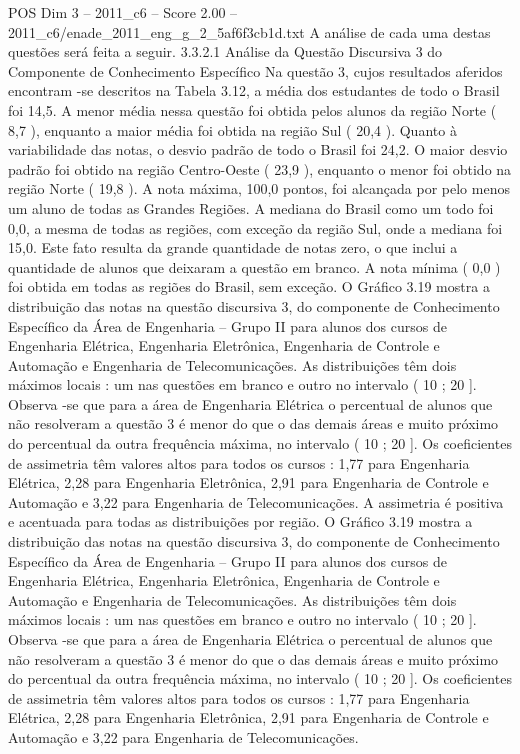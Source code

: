 \begin{textsample}{POS Dim 3 – 2011\_c6 – Score 2.00 – 2011\_c6/enade\_2011\_eng\_g\_2\_5af6f3cb1d.txt}
A análise de cada uma destas questões será feita a seguir. 3.3.2.1 Análise da Questão Discursiva 3 do Componente de Conhecimento Específico Na questão 3, cujos resultados aferidos encontram -se descritos na Tabela 3.12, a média dos estudantes de todo o Brasil foi 14,5.
A menor média nessa questão foi obtida pelos alunos da região Norte ( 8,7 ), enquanto a maior média foi obtida na região Sul ( 20,4 ).
Quanto à variabilidade das notas, o desvio padrão de todo o Brasil foi 24,2.
O maior desvio padrão foi obtido na região Centro-Oeste ( 23,9 ), enquanto o menor foi obtido na região Norte ( 19,8 ).
A nota máxima, 100,0 pontos, foi alcançada por pelo menos um aluno de todas as Grandes Regiões.
A mediana do Brasil como um todo foi 0,0, a mesma de todas as regiões, com exceção da região Sul, onde a mediana foi 15,0.
Este fato resulta da grande quantidade de notas zero, o que inclui a quantidade de alunos que deixaram a questão em branco.
A nota mínima ( 0,0 ) foi obtida em todas as regiões do Brasil, sem exceção.
O Gráfico 3.19 mostra a distribuição das notas na questão discursiva 3, do componente de Conhecimento Específico da Área de Engenharia – Grupo II para alunos dos cursos de Engenharia Elétrica, Engenharia Eletrônica, Engenharia de Controle e Automação e Engenharia de Telecomunicações.
As distribuições têm dois máximos locais : um nas questões em branco e outro no intervalo ( 10 ; 20 ].
Observa -se que para a área de Engenharia Elétrica o percentual de alunos que não resolveram a questão 3 é menor do que o das demais áreas e muito próximo do percentual da outra frequência máxima, no intervalo ( 10 ; 20 ].
Os coeficientes de assimetria têm valores altos para todos os cursos : 1,77 para Engenharia Elétrica, 2,28 para Engenharia Eletrônica, 2,91 para Engenharia de Controle e Automação e 3,22 para Engenharia de Telecomunicações.
A assimetria é positiva e acentuada para todas as distribuições por região.
O Gráfico 3.19 mostra a distribuição das notas na questão discursiva 3, do componente de Conhecimento Específico da Área de Engenharia – Grupo II para alunos dos cursos de Engenharia Elétrica, Engenharia Eletrônica, Engenharia de Controle e Automação e Engenharia de Telecomunicações.
As distribuições têm dois máximos locais : um nas questões em branco e outro no intervalo ( 10 ; 20 ].
Observa -se que para a área de Engenharia Elétrica o percentual de alunos que não resolveram a questão 3 é menor do que o das demais áreas e muito próximo do percentual da outra frequência máxima, no intervalo ( 10 ; 20 ].
Os coeficientes de assimetria têm valores altos para todos os cursos : 1,77 para Engenharia Elétrica, 2,28 para Engenharia Eletrônica, 2,91 para Engenharia de Controle e Automação e 3,22 para Engenharia de Telecomunicações.

\end{textsample}
